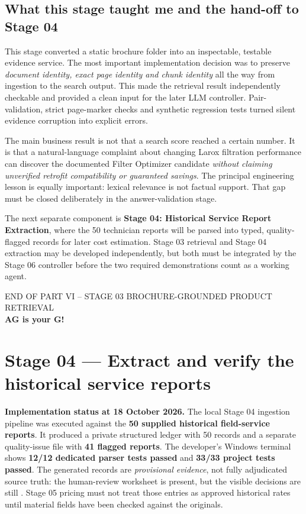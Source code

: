 \documentclass[11pt,a4paper]{article}
\DeclareRobustCommand{\code}[1]{{\ttfamily\small\detokenize{#1}}}
\begin{document}
\subsection{What this stage taught me and the hand-off to Stage 04}
This stage converted a static brochure folder into an inspectable, testable evidence service. The most important implementation decision was to preserve \emph{document identity, exact page identity and chunk identity} all the way from ingestion to the search output. This made the retrieval result independently checkable and provided a clean input for the later LLM controller. Pair-validation, strict page-marker checks and synthetic regression tests turned silent evidence corruption into explicit errors.

The main business result is not that a search score reached a certain number. It is that a natural-language complaint about changing Larox filtration performance can discover the documented Filter Optimizer candidate \emph{without claiming unverified retrofit compatibility or guaranteed savings}. The principal engineering lesson is equally important: lexical relevance is not factual support. That gap must be closed deliberately in the answer-validation stage.

The next separate component is \textbf{Stage 04: Historical Service Report Extraction}, where the 50 technician reports will be parsed into typed, quality-flagged records for later cost estimation. Stage 03 retrieval and Stage 04 extraction may be developed independently, but both must be integrated by the Stage 06 controller before the two required demonstrations count as a working agent.

\vspace{4mm}
\begin{center}
{\sffamily\color{Gray}\footnotesize END OF PART VI -- STAGE 03 BROCHURE-GROUNDED PRODUCT RETRIEVAL}\\[2mm]
{\sffamily\bfseries\color{Navy}AG is your G!}
\end{center}


\clearpage
\section{Stage 04 --- Extract and verify the historical service reports}
\label{sec:executed-stage04}
\begin{keybox}
\textbf{Implementation status at 18 October 2026.} The local Stage 04 ingestion pipeline was executed against the \textbf{50 supplied historical field-service reports}. It produced a private structured ledger with 50 records and a separate quality-issue file with \textbf{41 flagged reports}. The developer's Windows terminal shows \textbf{12/12 dedicated parser tests passed} and \textbf{33/33 project tests passed}. The generated records are \emph{provisional evidence}, not fully adjudicated source truth: the human-review worksheet is present, but the visible decisions are still \code{Pending}. Stage 05 pricing must not treat those entries as approved historical rates until material fields have been checked against the originals.
\end{keybox}
\end{document}
